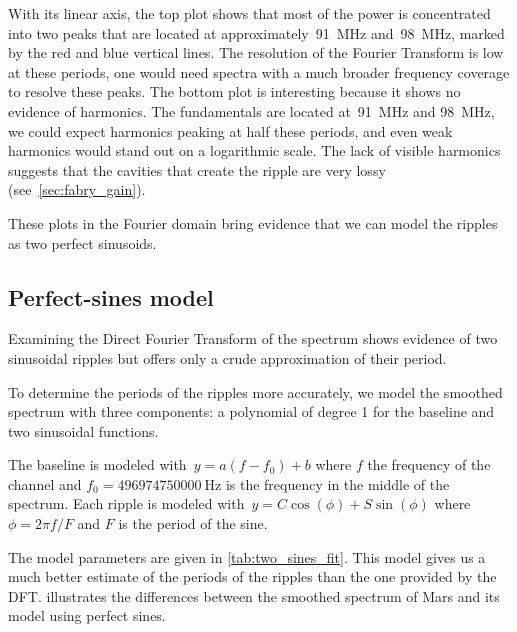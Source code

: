 With its linear axis, the top plot shows that most of the power is concentrated into two peaks that are located at approximately~\SI{91}{\mega\hertz} and~\SI{98}{\mega\hertz}, marked by the red and blue vertical lines.
The resolution of the Fourier Transform is low at these periods, one would need spectra with a much broader frequency coverage to resolve these peaks.
The bottom plot is interesting because it shows no evidence of harmonics.
The fundamentals are located at~\SI{91}{\mega\hertz} and \SI{98}{\mega\hertz}, we could expect harmonics peaking at half these periods, and even weak harmonics would stand out on a logarithmic scale.
The lack of visible harmonics suggests that the cavities that create the ripple are very lossy (see~\cref{sec:fabry_gain}).

These plots in the Fourier domain bring evidence that we can model the ripples as two perfect sinusoids.




\subsection{Perfect-sines model}
\label{sec:perfect_sines_model}
Examining the Direct Fourier Transform of the spectrum shows evidence of two sinusoidal ripples but offers only a crude approximation of their period.

To determine the periods of the ripples more accurately, we model the smoothed spectrum with three components: a polynomial of degree 1 for the baseline and two sinusoidal functions.

The baseline is modeled with~$y=a(f-f_0)+b$ where
$f$ the frequency of the channel and
$f_0=\SI{496974750000}{\hertz}$ is the frequency in the middle of the spectrum.
Each ripple is modeled with~$y = C \cos(\phi) + S \sin(\phi)$ where
$\phi = 2 \pi f / F$ and $F$ is the period of the sine.

The model parameters are given in \cref{tab:two_sines_fit}.
This model gives us a much better estimate of the periods of the ripples than the one provided by the DFT.
 illustrates the differences between the smoothed spectrum of Mars and its model using perfect sines.


